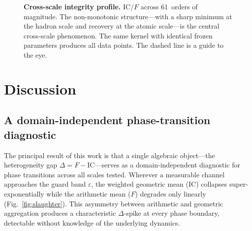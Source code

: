 \documentclass[11pt]{article}
\newcommand{\eps}{\varepsilon}
\newcommand{\IC}{\mathrm{IC}}
\begin{document}
\begin{figure}[!htbp]
\centering
{}
\caption{\textbf{Cross-scale integrity profile.} $\IC/F$ across
61~orders of magnitude. The non-monotonic structure---with a sharp
minimum at the hadron scale and recovery at the atomic scale---is the
central cross-scale phenomenon. The same kernel with identical frozen
parameters produces all data points. The dashed line is a guide to
the eye.}
\label{fig:crossscale}
\end{figure}

\clearpage
\section{Discussion}

\subsection{A domain-independent phase-transition diagnostic}

The principal result of this work is that a single algebraic
object---the heterogeneity gap $\Delta = F - \IC$---serves as a
domain-independent diagnostic for phase transitions across all scales
tested. Wherever a measurable channel approaches the guard band
$\eps$, the weighted geometric mean ($\IC$) collapses
super-exponentially while the arithmetic mean ($F$) degrades only
linearly (Fig.~\ref{fig:slaughter}). This asymmetry between
arithmetic and geometric aggregation produces a characteristic
$\Delta$-spike at every phase boundary, detectable without knowledge
of the underlying dynamics.
\end{document}
